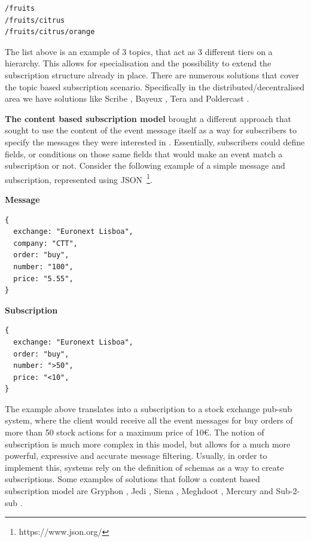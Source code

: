 \begin{verbatim}
/fruits
/fruits/citrus
/fruits/citrus/orange
\end{verbatim}

The list above is an example of 3 topics, that act as 3 different tiers
on a hierarchy. This allows for specialisation and the possibility to
extend the subscription structure already in place. There are numerous
solutions that cover the topic based subscription scenario. Specifically
in the distributed/decentralised area we have solutions like Scribe \cite{Castro2002},
Bayeux \cite{Zhuang2001}, Tera \cite{Baldoni2007} and Poldercast \cite{Setty2012}.
\bigskip

\textbf{The content based subscription model} brought a different
approach that sought to use the content of the event message itself as a
way for subscribers to specify the messages they were interested in \cite{Banavar1999}.
Essentially, subscribers could define fields, or conditions on those same fields that would make an event
match a subscription or not. Consider the following example of a simple
message and subscription, represented using JSON~\footnote{https://www.json.org/}.
\bigskip

\textbf{Message}

\begin{verbatim}
{
  exchange: "Euronext Lisboa",
  company: "CTT",
  order: "buy",
  number: "100",
  price: "5.55",
}
\end{verbatim}

\textbf{Subscription}

\begin{verbatim}
{
  exchange: "Euronext Lisboa",
  order: "buy",
  number: ">50",
  price: "<10",
}
\end{verbatim}

The example above translates into a subscription to a stock exchange
pub-sub system, where the client would receive all the event messages
for buy orders of more than 50 stock actions for a maximum price of
10\euro. The notion of subscription is much more complex in this
model, but allows for a much more powerful, expressive and accurate
message filtering. Usually, in order to implement this, systems rely on
the definition of schemas as a way to create subscriptions. Some
examples of solutions that follow a content based subscription model are
Gryphon \cite{Strom1998}, Jedi \cite{Cugola2001}, Siena \cite{Carzaniga2003},
Meghdoot \cite{Gupta2004}, Mercury \cite{Bharambe2002} and Sub-2-sub \cite{Voulgaris2005}.
\bigskip

